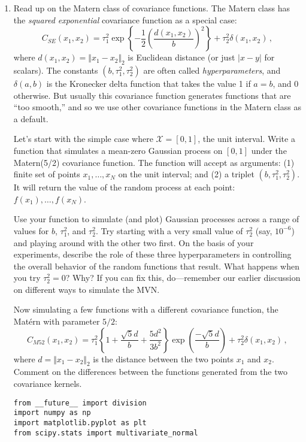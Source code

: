 \documentclass[10pt]{article}
\begin{document}
    \begin{enumerate}[label=(\Alph*)]
        \item   Read up on the Matern class of covariance functions.  The Matern class has the \textit{squared exponential} covariance function as a special case:
        $$
        C_{SE}(x_1, x_2) = \tau_1^2 \exp \left\{ - \frac{1}{2} \left( \frac{d(x_1, x_2)}{b} \right)^2 \right\} + \tau^2_2 \delta(x_1, x_2) \, ,
        $$
        where $d(x_1, x_2) = \Vert x_1 - x_2 \Vert_2$ is Euclidean distance (or just $|x-y|$ for scalars).  The constants $(b, \tau^2_1, \tau^2_2)$ are often called \textit{hyperparameters}, and $\delta(a,b)$ is the Kronecker delta function that takes the value 1 if $a=b$, and 0 otherwise.  But usually this covariance function generates functions that are ``too smooth,'' and so we use other covariance functions in the Matern class as a default.

        Let's start with the simple case where $\mathcal{X} = [0,1]$, the unit interval.  Write a function that simulates a mean-zero Gaussian process on $[0,1]$ under the Matern(5/2) covariance function.  The function will accept as arguments: (1) finite set of points $x_1, \ldots, x_N$ on the unit interval; and (2) a triplet $(b, \tau^2_1, \tau^2_2)$. It will return the value of the random process at each point: $f(x_1), \ldots, f(x_N)$.

        Use your function to simulate (and plot) Gaussian processes across a range of values for $b$, $\tau^2_1$, and $\tau^2_2$.  Try starting with a very small value of $\tau^2_2$ (say, $10^{-6}$) and playing around with the other two first.  On the basis of your experiments, describe the role of these three hyperparameters in controlling the overall behavior of the random functions that result.  What happens when you try $\tau^2_2 = 0$? Why?  If you can fix this, do---remember our earlier discussion on different ways to simulate the MVN.

        Now simulating a few functions with a different covariance function, the Mat\'ern with parameter $5/2$:
        $$
        C_{M52}(x_1, x_2) = \tau_1^2 \left\{ 1 + \frac{\sqrt{5}d}{b} + \frac{5d^2}{3b^2} \right\} \exp\left( \frac{-\sqrt{5}d}{b} \right) + \tau^2_2 \delta(x_1, x_2) \, ,
        $$
        where $d = \Vert x_1 - x_2 \Vert_2$ is the distance between the two points $x_1$ and $x_2$.  Comment on the differences between the functions generated from the two covariance kernels.\\

        \begin{lstlisting}
from __future__ import division
import numpy as np 
import matplotlib.pyplot as plt
from scipy.stats import multivariate_normal
        \end{lstlisting}


\end{enumerate}
\end{document}
